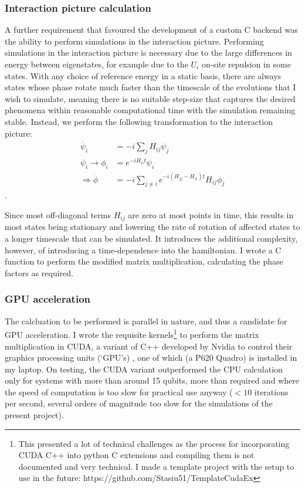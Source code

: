 \documentclass{report}
\begin{document}
\subsubsection{Interaction picture calculation}
A further requirement that favoured the development of a custom C backend was the ability to perform simulations in the interaction picture. Performing simulations in the interaction picture is necessary due to the large differences in energy between eigenstates, for example due to the $U_i$ on-site repulsion in some states. With any choice of reference energy in a static basis, there are always states whose phase rotate much faster than the timescale of the evolutions that I wish to simulate, meaning there is no suitable step-size that captures the desired phenomena within reasonable computational time with the simulation remaining stable. Instead, we perform the following transformation to the interaction picture:
\begin{align*}
    \dot{\psi_i} &= -i\sum_j{H_{ij}\psi_j}\\
     \psi_i \rightarrow \phi_i &= e^{-i H_{ii} t} \psi_i \\
    \Rightarrow \dot{\phi} &= -i\sum_{j\ne i}{e^{- i (H_{jj} - H_{ii})t} H_{ij}\phi_j}
\end{align*}.

Since most off-diagonal terms $H_{ij}$ are zero at most points in time, this results in most states being stationary and lowering the rate of rotation of affected states to a longer timescale that can be simulated. It introduces the additional complexity, however, of introducing a time-dependence into the hamiltonian. I wrote a C function to perform the modified matrix multiplication, calculating the phase factors as required.

\subsubsection{GPU acceleration}
The calcluation to be performed is parallel in nature, and thus a candidate for GPU acceleration. I wrote the requisite kernels\footnote{This presented a lot of technical challenges as the process for incorporating CUDA C++ into python C extensions and compiling them is not documented and very technical. I made a template project with the setup to use in the future: https://github.com/Stasiu51/TemplateCudaEx} to perform the matrix multiplication in CUDA, a variant of C++ developed by Nvidia to control their graphics processing units (`GPU's) \cite{cuda}, one of which (a P620 Quadro) is installed in my laptop. On testing, the CUDA variant outperformed the CPU calculation only for systems with more than around 15 qubits, more than required and where the speed of computation is too slow for practical use anyway ($<10$ iterations per second, several orders of magnitude too slow for the simulations of the present project).
\end{document}
